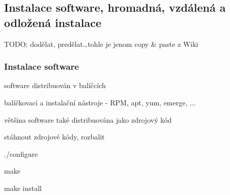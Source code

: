 \subsection{Instalace software, hromadná, vzdálená a odložená instalace}

TODO: dodělat, predělat\dots tohle je jenom copy \& paste z Wiki

\subsubsection*{Instalace software}

\begin{pitemize}
    \item software distribuován v balíčcích
    \item balíčkovací a instalační nástroje - RPM, apt, yum, emerge, ...
    \item většina software také distribuována jako zdrojový kód
    \begin{pitemize}
      \item stáhnout zdrojové kódy, rozbalit
      \item ./configure 
      \item make 
      \item make install  
    \end{pitemize}
\end{pitemize}
